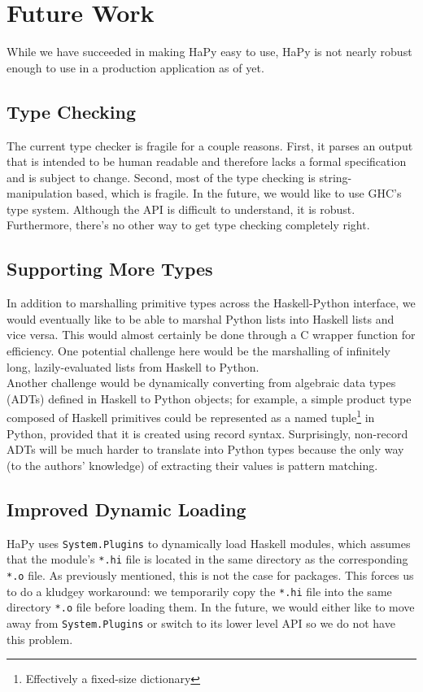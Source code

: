 \documentclass[11pt, letterpaper, oneside, twocolumn] {article}
\begin{document}
\section{Future Work}

While we have succeeded in making HaPy easy to use, HaPy is not nearly robust enough to use in a production application as of yet.

\subsection{Type Checking}

The current type checker is fragile for a couple reasons. First, it parses an output that is intended to be human readable and therefore lacks a formal specification and is subject to change. Second, most of the type checking is string-manipulation based, which is fragile. In the future, we would like to use GHC's type system.  Although the API is difficult to understand, it is robust.  Furthermore, there's no other way to get type checking completely right. 

\subsection{Supporting More Types}
In addition to marshalling primitive types across the Haskell-Python interface, we would eventually like to be able to marshal Python lists into Haskell lists and vice versa. This would almost certainly be done through a C wrapper function for efficiency.  One potential challenge here would be the marshalling of infinitely long, lazily-evaluated lists from Haskell to Python.\\
Another challenge would be dynamically converting from algebraic data types (ADTs) defined in Haskell to Python objects; for example, a simple product type composed of Haskell primitives could be represented as a named tuple\footnote{Effectively a fixed-size dictionary} in Python, provided that it is created using record syntax.  Surprisingly, non-record ADTs will be much harder to translate into Python types because the only way (to the authors' knowledge) of extracting their values is pattern matching.

\subsection{Improved Dynamic Loading}
HaPy uses \verb!System.Plugins! to dynamically load Haskell modules, which assumes that the module's \verb!*.hi! file is located in the same directory as the corresponding \verb!*.o! file. As previously mentioned, this is not the case for packages. This forces us to do a kludgey workaround: we temporarily copy the \verb!*.hi! file into the same directory \verb!*.o! file before loading them. In the future, we would either like to move away from \verb!System.Plugins! or switch to its lower level API so we do not have this problem. 
\end{document}
